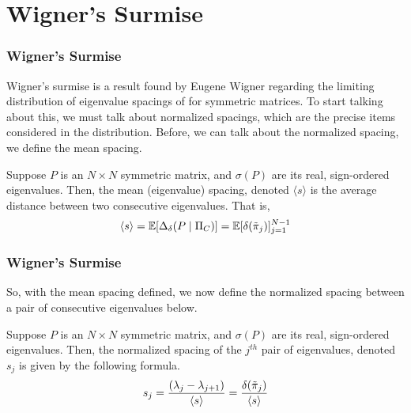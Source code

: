 \section{Wigner's Surmise}

\begin{frame} \frametitle{Wigner's Surmise}

Wigner's surmise is a result found by Eugene Wigner regarding the limiting distribution of eigenvalue spacings of for symmetric matrices.
To start talking about this, we must talk about normalized spacings, which are the precise items considered in the distribution.
Before, we can talk about the normalized spacing, we define the mean spacing.

\begin{alertblock}{}
Suppose $P$ is an $N \times N$ symmetric matrix, and $\sigma(P)$ are its real, sign-ordered eigenvalues.
Then, the mean (eigenvalue) spacing, denoted $\langle s \rangle$ is the average distance between two consecutive eigenvalues. That is,
$$\langle s \rangle = \mathbb{E}[\Delta_\delta(P \mid \Pi_C)] = \mathbb{E}[\delta({\tilde{\pi}}_{j})]_{j = 1}^{N - 1}$$
\end{alertblock}

\end{frame}


\begin{frame} \frametitle{Wigner's Surmise}

\noindent So, with the mean spacing defined, we now define the normalized spacing between a pair of consecutive eigenvalues below.

\begin{alertblock}{}
Suppose $P$ is an $N \times N$ symmetric matrix, and $\sigma(P)$ are its real, sign-ordered eigenvalues.
Then, the normalized spacing of the $j^{th}$ pair of eigenvalues, denoted $s_j$ is given by the following formula.
$$s_j = \frac{(\lambda_j - \lambda_{j+1})}{{\langle s \rangle}} = \frac{\delta({\tilde{\pi}}_{j})}{\langle s \rangle}$$
\end{alertblock}

\end{frame}

